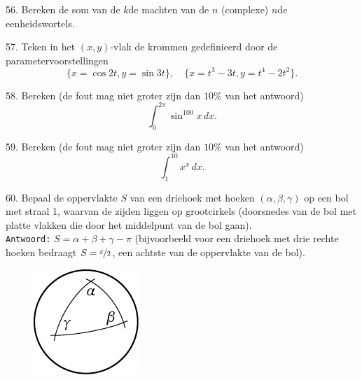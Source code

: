 \begin{problem}{56.}
	Bereken de som van de $k$de machten van de $n$ (complexe) $n$de eenheidswortels.
\end{problem}

\begin{problem}{57.}
	Teken in het $(x,y)$-vlak de krommen gedefinieerd door de para\-metervoorstellingen
	\begin{equation*}
		\{x = \cos 2 t, y = \sin 3 t\},\quad
		\{x = t^3 - 3 t, y = t^4 - 2 t^2\}.
	\end{equation*}
\end{problem}

\begin{problem}{58.}
	Bereken (de fout mag niet groter zijn dan $10\%$ van het antwoord)
	\begin{equation*}
		\int_{0}^{2 \pi} \sin^{100} x\,dx.
	\end{equation*}
\end{problem}

\begin{problem}{59.}
	Bereken (de fout mag niet groter zijn dan $10\%$ van het antwoord)
	\begin{equation*}
		\int_{1}^{10} x^x\,dx.
	\end{equation*}
\end{problem}

\begin{problem}{60.}
	Bepaal de oppervlakte $S$ van een driehoek met hoeken $(\alpha,\beta,\gamma)$ op een bol met straal 1, waarvan de zijden liggen op grootcirkels (doorsnedes van de bol met platte vlakken die door het middelpunt van de bol gaan).\\

\noindent \texttt{Antwoord:} $S = \alpha + \beta + \gamma - \pi$ (bijvoorbeeld voor een driehoek met drie rechte hoeken bedraagt $S = \nicefrac{\pi}{2}$, een achtste van de oppervlakte van de bol).
	\begin{figure}
		\null\hfill
		\includegraphics{resources/taskbook-44}
		\hfill\null
	\end{figure}
\end{problem}

